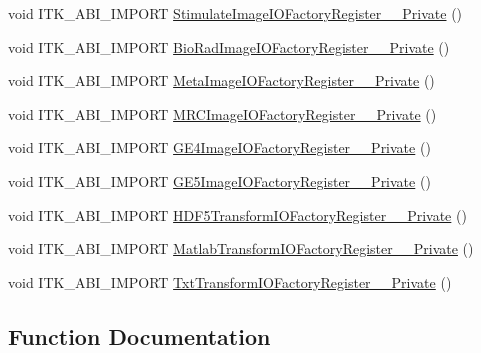 \begin{DoxyCompactItemize}
\item 
void I\+T\+K\+\_\+\+A\+B\+I\+\_\+\+I\+M\+P\+O\+RT \hyperlink{namespaceitk_a71cd83eaaddc4c6eca1a965588a8f982}{Stimulate\+Image\+I\+O\+Factory\+Register\+\_\+\+\_\+\+Private} ()
\item 
void I\+T\+K\+\_\+\+A\+B\+I\+\_\+\+I\+M\+P\+O\+RT \hyperlink{namespaceitk_a2b164e742681d9c11f198a76a3c0a82b}{Bio\+Rad\+Image\+I\+O\+Factory\+Register\+\_\+\+\_\+\+Private} ()
\item 
void I\+T\+K\+\_\+\+A\+B\+I\+\_\+\+I\+M\+P\+O\+RT \hyperlink{namespaceitk_a4f9dedcff628b457ab5887dc4ad13dac}{Meta\+Image\+I\+O\+Factory\+Register\+\_\+\+\_\+\+Private} ()
\item 
void I\+T\+K\+\_\+\+A\+B\+I\+\_\+\+I\+M\+P\+O\+RT \hyperlink{namespaceitk_a7d13200948d9832f452f4db9e6a15c14}{M\+R\+C\+Image\+I\+O\+Factory\+Register\+\_\+\+\_\+\+Private} ()
\item 
void I\+T\+K\+\_\+\+A\+B\+I\+\_\+\+I\+M\+P\+O\+RT \hyperlink{namespaceitk_afd0dc0efdc5be70ae2e1a387458398cc}{G\+E4\+Image\+I\+O\+Factory\+Register\+\_\+\+\_\+\+Private} ()
\item 
void I\+T\+K\+\_\+\+A\+B\+I\+\_\+\+I\+M\+P\+O\+RT \hyperlink{namespaceitk_aaa411fc9edcab8e2e2b2cf20596c6029}{G\+E5\+Image\+I\+O\+Factory\+Register\+\_\+\+\_\+\+Private} ()
\item 
void I\+T\+K\+\_\+\+A\+B\+I\+\_\+\+I\+M\+P\+O\+RT \hyperlink{namespaceitk_a87fd0c93239c3ba0a87eba9e26f8ed25}{H\+D\+F5\+Transform\+I\+O\+Factory\+Register\+\_\+\+\_\+\+Private} ()
\item 
void I\+T\+K\+\_\+\+A\+B\+I\+\_\+\+I\+M\+P\+O\+RT \hyperlink{namespaceitk_ad39c0a78a28fe097bf0462c9db02210a}{Matlab\+Transform\+I\+O\+Factory\+Register\+\_\+\+\_\+\+Private} ()
\item 
void I\+T\+K\+\_\+\+A\+B\+I\+\_\+\+I\+M\+P\+O\+RT \hyperlink{namespaceitk_af8bd67f5fc64ed2791143c9187ac7eb6}{Txt\+Transform\+I\+O\+Factory\+Register\+\_\+\+\_\+\+Private} ()
\end{DoxyCompactItemize}


\subsection{Function Documentation}
\mbox{\label{namespaceitk_a2b164e742681d9c11f198a76a3c0a82b}} 
